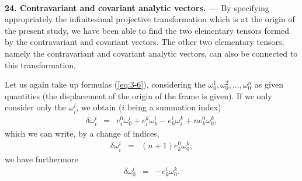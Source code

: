 
\ \\

{\bf 24. Contravariant and covariant analytic vectors. --- }
% 
By specifying appropriately the infinitesimal projective transformation which is at the origin of the present study, we have been able to find the two elementary tensors formed by the contravariant and covariant vectors. The other two elementary tensors, namely the contravariant and covariant analytic vectors, can also be connected to this transformation.

Let us again take up formulas (\ref{eq:3-6}), considering the $\omega^1_0, \omega^2_0, ..., \omega^n_0$ as given quantities (the displacement of the origin of the frame is given). If we only consider only the $\omega^i_i$, we obtain ($i$ being a summation index)
\begin{eqnarray*}
\delta \omega^i_i &=& e^0_i \omega^i_0 + e^k_i \omega^i_k - e^i_k \omega^k_i + n e^0_k \omega^k_0, 
\end{eqnarray*}
which we can write, by a change of indices,
\begin{eqnarray*}
\delta \omega^i_i &=&  (n + 1) e^0_k \omega^k_0 ;
\end{eqnarray*}
we have furthermore
\begin{eqnarray*}
\delta \omega^i_0 &=&  - e^i_k \omega^k_0  . 
\end{eqnarray*}

